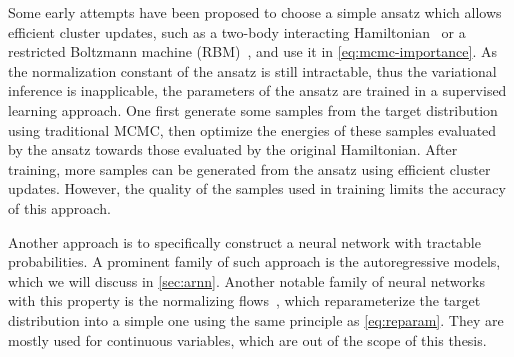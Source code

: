 Some early attempts have been proposed to choose a simple ansatz which allows efficient cluster updates, such as a two-body interacting Hamiltonian~\cite{liu2017self} or a restricted Boltzmann machine (RBM)~\cite{huang2017accelerated}, and use it in \cref{eq:mcmc-importance}. As the normalization constant of the ansatz is still intractable, thus the variational inference is inapplicable, the parameters of the ansatz are trained in a supervised learning approach. One first generate some samples from the target distribution using traditional MCMC, then optimize the energies of these samples evaluated by the ansatz towards those evaluated by the original Hamiltonian. After training, more samples can be generated from the ansatz using efficient cluster updates. However, the quality of the samples used in training limits the accuracy of this approach.

Another approach is to specifically construct a neural network with tractable probabilities. A prominent family of such approach is the autoregressive models, which we will discuss in \cref{sec:arnn}. Another notable family of neural networks with this property is the normalizing flows~\cite{song2017nice, muller2019neural}, which reparameterize the target distribution into a simple one using the same principle as \cref{eq:reparam}. They are mostly used for continuous variables, which are out of the scope of this thesis.


